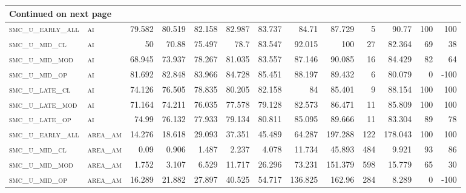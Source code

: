 \begin{landscape}
\begin{center}
\begin{footnotesize}
\begin{longtable}{llrrrrrrrr|rrr}
\hline \multicolumn{13}{|l|}{{Continued on next page}} \\ \hline
\endfoot

\hline \hline
\endlastfoot

\textsc{smc\_u\_early\_all} & \textsc{ai        }   & 79.582   & 80.519   & 82.158   & 82.987   & 83.737   & 84.71    & 87.729    & 5      & 90.77         & 100           & 100             \\
\textsc{smc\_u\_mid\_cl   } & \textsc{ai        }   & 50       & 70.88    & 75.497   & 78.7     & 83.547   & 92.015   & 100       & 27     & 82.364        & 69            & 38              \\
\textsc{smc\_u\_mid\_mod  } & \textsc{ai        }   & 68.945   & 73.937   & 78.267   & 81.035   & 83.557   & 87.146   & 90.085    & 16     & 84.429        & 82            & 64              \\
\textsc{smc\_u\_mid\_op   } & \textsc{ai        }   & 81.692   & 82.848   & 83.966   & 84.728   & 85.451   & 88.197   & 89.432    & 6      & 80.079        & 0             & -100            \\
\textsc{smc\_u\_late\_cl  } & \textsc{ai        }   & 74.126   & 76.505   & 78.835   & 80.205   & 82.158   & 84       & 85.401    & 9      & 88.154        & 100           & 100             \\
\textsc{smc\_u\_late\_mod } & \textsc{ai        }   & 71.164   & 74.211   & 76.035   & 77.578   & 79.128   & 82.573   & 86.471    & 11     & 85.809        & 100           & 100             \\
\textsc{smc\_u\_late\_op  } & \textsc{ai        }   & 74.99    & 76.132   & 77.933   & 79.134   & 80.811   & 85.095   & 89.666    & 11     & 83.304        & 89            & 78              \\
\textsc{smc\_u\_early\_all} & \textsc{area\_am  }   & 14.276   & 18.618   & 29.093   & 37.351   & 45.489   & 64.287   & 197.288   & 122    & 178.043       & 100           & 100             \\
\textsc{smc\_u\_mid\_cl   } & \textsc{area\_am  }   & 0.09     & 0.906    & 1.487    & 2.237    & 4.078    & 11.734   & 45.893    & 484    & 9.921         & 93            & 86              \\
\textsc{smc\_u\_mid\_mod  } & \textsc{area\_am  }   & 1.752    & 3.107    & 6.529    & 11.717   & 26.296   & 73.231   & 151.379   & 598    & 15.779        & 65            & 30              \\
\textsc{smc\_u\_mid\_op   } & \textsc{area\_am  }   & 16.289   & 21.882   & 27.897   & 40.525   & 54.717   & 136.825  & 162.96    & 284    & 8.289         & 0             & -100            \\

\end{longtable}
\end{footnotesize}
\end{center}
\end{landscape}
